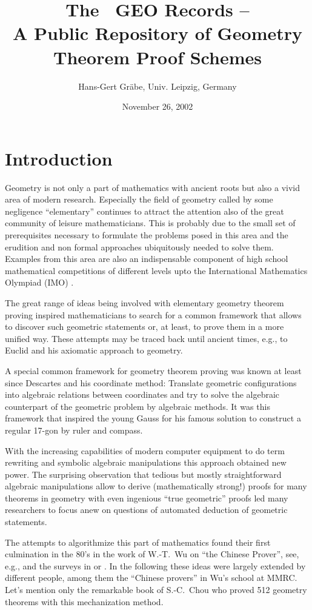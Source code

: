 \documentclass[11pt]{article}
\title{The \SD\ GEO Records --\\ A Public Repository of Geometry Theorem Proof
  Schemes}
\author{Hans-Gert Gr\"abe, Univ. Leipzig, Germany}
\date{November 26, 2002}
\begin{document}
\maketitle

\section{Introduction}

Geometry is not only a part of mathematics with ancient roots but also a vivid
area of modern research. Especially the field of geometry called by some
negligence ``elementary'' continues to attract the attention also of the great
community of leisure mathematicians.  This is probably due to the small set of
prerequisites necessary to formulate the problems posed in this area and the
erudition and non formal approaches ubiquitously needed to solve them.
Examples from this area are also an indispensable component of high school
mathematical competitions of different levels upto the International
Mathematics Olympiad (IMO) \cite{IMO}.  \medskip

The great range of ideas being involved with elementary geometry theorem
proving inspired mathematicians to search for a common framework that allows
to discover such geometric statements or, at least, to prove them in a more
unified way. These attempts may be traced back until ancient times, e.g., to
Euclid and his axiomatic approach to geometry.

A special common framework for geometry theorem proving was known at least
since Descartes and his coordinate method: Translate geometric configurations
into algebraic relations between coordinates and try to solve the algebraic
counterpart of the geometric problem by algebraic methods. It was this
framework that inspired the young Gauss for his famous solution to construct a
regular 17-gon by ruler and compass.

With the increasing capabilities of modern computer equipment to do term
rewriting and symbolic algebraic manipulations this approach obtained new
power. The surprising observation that tedious but mostly straightforward
algebraic manipulations allow to derive (mathematically strong!) proofs for
many theorems in geometry with even ingenious ``true geometric'' proofs led
many researchers to focus anew on questions of automated deduction of
geometric statements.

The attempts to algorithmize this part of mathematics found their first
culmination in the 80's in the work of W.-T.~Wu on ``the Chinese Prover'',
see, e.g., \cite{Wu_84a, Wu_84b} and the surveys in \cite{Books/Wu_94a} or
\cite{Wu_99a}. In the following these ideas were largely extended by different
people, among them the ``Chinese provers'' in Wu's school at MMRC.  Let's
mention only the remarkable book \cite{Books/Chou_88a} of S.-C.~Chou who
proved 512 geometry theorems with this mechanization method.
\end{document}
